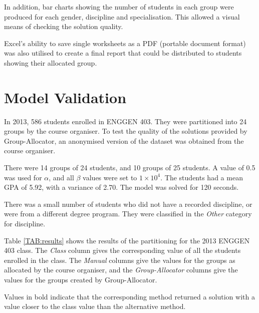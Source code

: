 \documentclass[12pt]{ORSNZ}
\begin{document}
In addition, bar charts showing the number of students in each group were produced for each gender, discipline and specialisation. This allowed a visual means of checking the solution quality. 

Excel's ability to save single worksheets as a PDF (portable document format) was also utilised to create a final report that could be distributed to students showing their allocated group.

\section{Model Validation}
In 2013, 586 students enrolled in ENGGEN 403. They were partitioned into 24 groups by the course organiser. To test the quality of the solutions provided by Group-Allocator, an anonymised version of the dataset was obtained from the course organiser.

There were 14 groups of 24 students, and 10 groups of 25 students. A value of 0.5 was used for $\alpha$, and all $\beta$ values were set to $1 \times 10^4$. The students had a mean GPA of 5.92, with a variance of 2.70. The model was solved for 120 seconds. 

There was a small number of students who did not have a recorded discipline, or were from a different degree program. They were classified in the \emph{Other} category for discipline. 

Table \ref{TAB:results} shows the results of the partitioning for the 2013 ENGGEN 403 class. The \emph{Class} column gives the corresponding value of all the students enrolled in the class. The \emph{Manual} columns give the values for the groups as allocated by the course organiser, and the \emph{Group-Allocator} columns give the values for the groups created by Group-Allocator.

Values in bold indicate that the corresponding method returned a solution with a value closer to the class value than the alternative method.
\end{document}
